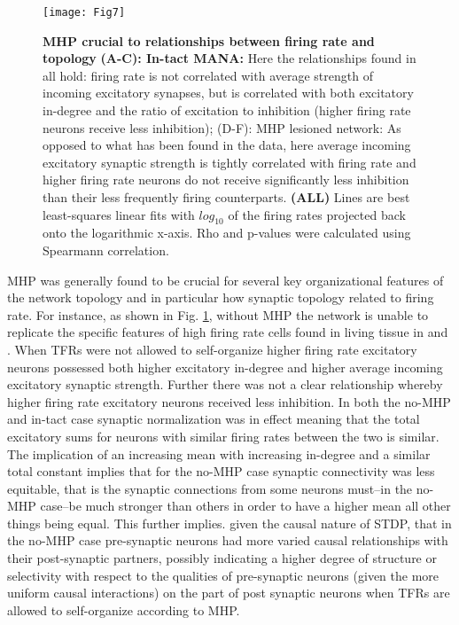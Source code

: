 \documentclass[10pt,letterpaper]{article}
\begin{document}
\begin{figure}[!h]
	\centering
	\texttt{[image: Fig7]}
	\caption{{\bf MHP crucial to relationships between firing rate and topology}
		\textbf{(A-C): In-tact MANA: }Here the relationships found in \cite{yassin2010embedded, benedetti2012differential} all hold: firing rate is not correlated with average strength of incoming excitatory synapses, but is correlated with both excitatory in-degree and the ratio of excitation to inhibition (higher firing rate neurons receive less inhibition); (D-F): MHP lesioned network: As opposed to what has been found in the data, here average incoming excitatory synaptic strength is tightly correlated with firing rate and higher firing rate neurons do not receive significantly less inhibition than their less frequently firing counterparts. \textbf{(ALL)} Lines are best least-squares linear fits with $log_{10}$ of the firing rates projected back onto the logarithmic x-axis. Rho and p-values were calculated using Spearmann correlation.  \footnotesize }
	\label{Fig7}
\end{figure}

MHP was generally found to be crucial for several key organizational features of the network topology and in particular how synaptic topology related to firing rate. For instance, as shown in Fig. \ref{Fig7}, without MHP the network is unable to replicate the specific features of high firing rate cells found in living tissue in \cite{yassin2010embedded} and \cite{benedetti2012differential}. When TFRs were not allowed to self-organize higher firing rate excitatory neurons possessed both higher excitatory in-degree and higher average incoming excitatory synaptic strength. Further there was not a clear relationship whereby higher firing rate excitatory neurons received less inhibition. In both the no-MHP and in-tact case synaptic normalization was in effect meaning that the total excitatory sums for neurons with similar firing rates between the two is similar. The implication of an increasing mean with increasing in-degree and a similar total constant implies that for the no-MHP case synaptic connectivity was less equitable, that is the synaptic connections from some neurons must--in the no-MHP case--be much stronger than others in order to have a higher mean all other things being equal. This further implies. given the causal nature of STDP, that in the no-MHP case pre-synaptic neurons had more varied causal relationships with their post-synaptic partners, possibly indicating a higher degree of structure or selectivity with respect to the qualities of pre-synaptic neurons (given the more uniform causal interactions) on the part of post synaptic neurons when TFRs are allowed to self-organize according to MHP. 
\end{document}

